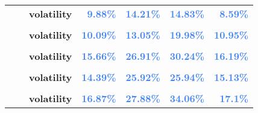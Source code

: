 \documentclass[
  authoryear,
  preprint,
  3p]{elsarticle}
\begin{document}
\begin{longtable}[t]{>{}l>{}l>{}l>{}r>{}r>{}r>{}r}
\textbf{} & \textbf{} & \textbf{volatility} & \textcolor[HTML]{4285f4}{\textbf{9.88\%}} & \textcolor[HTML]{4285f4}{\textbf{14.21\%}} & \textcolor[HTML]{4285f4}{\textbf{14.83\%}} & \textcolor[HTML]{4285f4}{\textbf{8.59\%}}\\
\textbf{\cellcolor{gray!10}{}} & \textbf{\cellcolor{gray!10}{contango}} & \textbf{\cellcolor{gray!10}{mean}} & \textcolor[HTML]{4285f4}{\textbf{\cellcolor{gray!10}{-1.09\%}}} & \textcolor[HTML]{4285f4}{\textbf{\cellcolor{gray!10}{*16.16\%}}} & \textcolor[HTML]{4285f4}{\textbf{\cellcolor{gray!10}{4.9\%}}} & \textcolor[HTML]{4285f4}{\textbf{\cellcolor{gray!10}{-6.33\%}}}\\
\addlinespace
\textbf{} & \textbf{} & \textbf{volatility} & \textcolor[HTML]{4285f4}{\textbf{10.09\%}} & \textcolor[HTML]{4285f4}{\textbf{13.05\%}} & \textcolor[HTML]{4285f4}{\textbf{19.98\%}} & \textcolor[HTML]{4285f4}{\textbf{10.95\%}}\\
\textbf{\cellcolor{gray!10}{GB commodities}} & \textbf{\cellcolor{gray!10}{whole period}} & \textbf{\cellcolor{gray!10}{mean}} & \textcolor[HTML]{4285f4}{\textbf{\cellcolor{gray!10}{2.47\%}}} & \textcolor[HTML]{4285f4}{\textbf{\cellcolor{gray!10}{*21.77\%}}} & \textcolor[HTML]{4285f4}{\textbf{\cellcolor{gray!10}{5.25\%}}} & \textcolor[HTML]{4285f4}{\textbf{\cellcolor{gray!10}{2.72\%}}}\\
\textbf{} & \textbf{} & \textbf{volatility} & \textcolor[HTML]{4285f4}{\textbf{15.66\%}} & \textcolor[HTML]{4285f4}{\textbf{26.91\%}} & \textcolor[HTML]{4285f4}{\textbf{30.24\%}} & \textcolor[HTML]{4285f4}{\textbf{16.19\%}}\\
\textbf{\cellcolor{gray!10}{}} & \textbf{\cellcolor{gray!10}{backwardation}} & \textbf{\cellcolor{gray!10}{mean}} & \textcolor[HTML]{4285f4}{\textbf{\cellcolor{gray!10}{4.41\%}}} & \textcolor[HTML]{4285f4}{\textbf{\cellcolor{gray!10}{8.01\%}}} & \textcolor[HTML]{4285f4}{\textbf{\cellcolor{gray!10}{15.06\%}}} & \textcolor[HTML]{4285f4}{\textbf{\cellcolor{gray!10}{**19.95\%}}}\\
\textbf{} & \textbf{} & \textbf{volatility} & \textcolor[HTML]{4285f4}{\textbf{14.39\%}} & \textcolor[HTML]{4285f4}{\textbf{25.92\%}} & \textcolor[HTML]{4285f4}{\textbf{25.94\%}} & \textcolor[HTML]{4285f4}{\textbf{15.13\%}}\\
\addlinespace
\textbf{\cellcolor{gray!10}{}} & \textbf{\cellcolor{gray!10}{contango}} & \textbf{\cellcolor{gray!10}{mean}} & \textcolor[HTML]{4285f4}{\textbf{\cellcolor{gray!10}{0.34\%}}} & \textcolor[HTML]{4285f4}{\textbf{\cellcolor{gray!10}{*35.56\%}}} & \textcolor[HTML]{4285f4}{\textbf{\cellcolor{gray!10}{-5.24\%}}} & \textcolor[HTML]{4285f4}{\textbf{\cellcolor{gray!10}{-14.05\%}}}\\
\textbf{} & \textbf{} & \textbf{volatility} & \textcolor[HTML]{4285f4}{\textbf{16.87\%}} & \textcolor[HTML]{4285f4}{\textbf{27.88\%}} & \textcolor[HTML]{4285f4}{\textbf{34.06\%}} & \textcolor[HTML]{4285f4}{\textbf{17.1\%}}\\
\bottomrule

\end{longtable}
\end{document}
